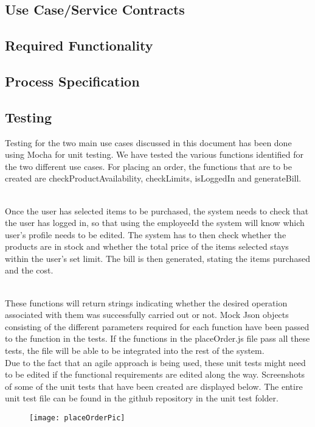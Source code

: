 \documentclass[12pt]{article}
\begin{document}
\subsection{Use Case/Service Contracts}

\subsection{Required Functionality}

\subsection{Process Specification}

\subsection{Testing}

Testing for the two main use cases discussed in this document has been done using Mocha for unit testing. We have tested the various functions identified for the two different use cases. For placing an order, the functions that are to be created are checkProductAvailability, checkLimits, isLoggedIn and generateBill. 

\\Once the user has selected items to be purchased, the system needs to check that the user has logged in, so that using the employeeId the system will know which user's profile needs to be edited. The system has to then check whether the products are in stock and whether the total price of the items selected stays within the user's set limit. The bill is then generated, stating the items purchased and the cost.

\\These functions will return strings indicating whether the desired operation associated with them was successfully carried out or not. Mock Json objects consisting of the different parameters required for each function have been passed to the function in the tests. If the functions in the placeOrder.js file pass all these tests, the file will be able to be integrated into the rest of the system. 
\\
Due to the fact that an agile approach is being used, these unit tests might need to be edited if the functional requirements are edited along the way. Screenshots of some of the unit tests that have been created are displayed below. The entire unit test file can be found in the github repository in the unit test folder.  
\begin{figure}[h!]
  \centering
    \texttt{[image: placeOrderPic]} 
\end{figure}
\end{document}
